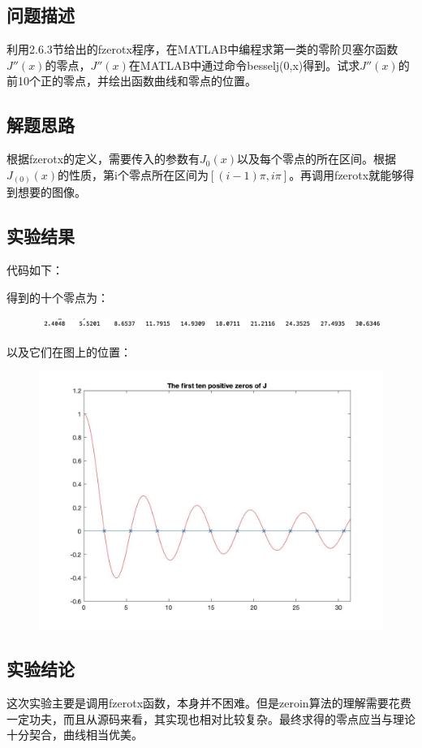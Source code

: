 \documentclass[12pt, utf8, hyperref]{article}
\begin{document}
\subsection*{问题描述}
利用2.6.3节给出的fzerotx程序，在MATLAB中编程求第一类的零阶贝塞尔函数$J''(x)$的零点，$J''(x)$在MATLAB中通过命令besselj(0,x)得到。试求$J''(x)$的前10个正的零点，并绘出函数曲线和零点的位置。

\subsection*{解题思路}
根据fzerotx的定义，需要传入的参数有$J_0(x)$以及每个零点的所在区间。根据$J_(0)(x)$的性质，第i个零点所在区间为$[(i-1)\pi, i\pi]$。再调用fzerotx就能够得到想要的图像。

\subsection*{实验结果}
代码如下：

得到的十个零点为：
\begin{figure}[H]
	\centering
	\includegraphics[scale=0.5]{photos/zeros.png}
\end{figure}
以及它们在图上的位置：
\begin{figure}[H]
	\centering
	\includegraphics[scale=0.4]{photos/j0_zero.jpg}
\end{figure}

\subsection*{实验结论}
这次实验主要是调用fzerotx函数，本身并不困难。但是zeroin算法的理解需要花费一定功夫，而且从源码来看，其实现也相对比较复杂。最终求得的零点应当与理论十分契合，曲线相当优美。
\end{document}
